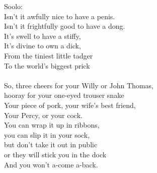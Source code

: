
            Soolo: \\
            Isn't it awfully nice to have a penis. \\
            Isn't it frightfully good to have a dong. \\
            It's swell to have a stiffy, \\
            It's divine to own a dick, \\
            From the tiniest little tadger \\
            To the world's biggest prick \\
\hspace{10mm} \\
            So, three cheers for your Willy or John Thomas, \\
            hooray for your one-eyed trouser snake \\
            Your piece of pork, your wife's best friend, \\
            Your Percy, or your cock. \\
            You can wrap it up in ribbons, \\
            you can slip it in your sock, \\
            but don't take it out in public \\
            or they will stick you in the dock \\
            And you won't a-come a-back. \\
